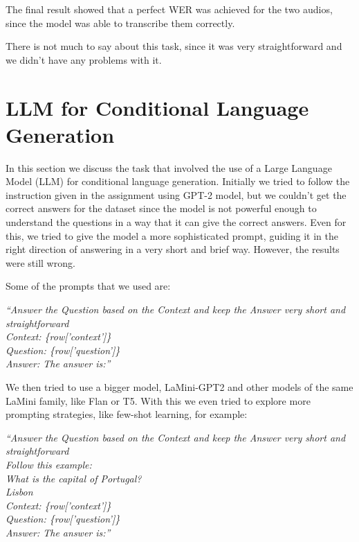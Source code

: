 \documentclass{Interspeech2024}
\begin{document}
The final result showed that a perfect WER was achieved for the two audios, since the model was able to transcribe them correctly.

There is not much to say about this task, since it was very
straightforward and we didn't have any problems with it.

\section{LLM for Conditional Language Generation}

In this section we discuss the task that 
involved the use of a Large Language Model (LLM) for
conditional language generation. 
Initially we tried to follow the instruction 
given in the assignment using GPT-2 model, but we
couldn't get the correct answers for the dataset since 
the model is not powerful enough to understand the
questions in a way that it can give the correct answers.
Even for this, we tried to give the model a more sophisticated
prompt, guiding it in the right direction of answering 
in a very short and brief way. However, the results were
still wrong.

Some of the prompts that we used are:


\begin{center}
  \textit{``Answer the Question based on the Context and keep the Answer very short and straightforward \\ 
  Context: \{row['context']\} \\ 
  Question: \{row['question']\} \\ 
  Answer: The answer is:''}\end{center}

We then tried to use a bigger model, LaMini-GPT2 and other 
models of the same LaMini family, like Flan or T5. With this 
we even tried to explore more prompting strategies, like few-shot
learning, for example:

\begin{center}
  \textit{``Answer the Question based on the Context and keep the Answer very short and straightforward \\
  Follow this example: \\
  What is the capital of Portugal? \\
  Lisbon\\
  Context: \{row['context']\} \\
  Question: \{row['question']\} \\
  Answer: The answer is:''}\end{center}
  
\end{document}
